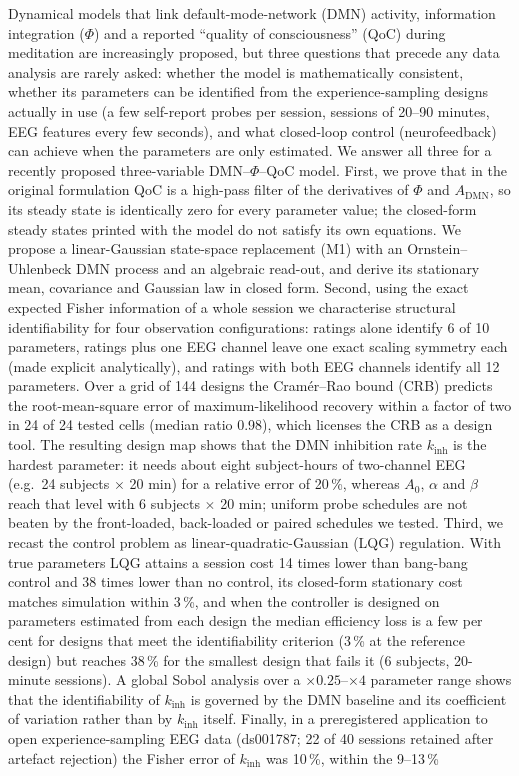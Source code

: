 \documentclass[12pt,a4paper]{article}
\theoremstyle{plain}
\theoremstyle{definition}
\theoremstyle{remark}
\newcommand{\kinh}{k_{\mathrm{inh}}}
\begin{document}
\vspace{0.3cm}
\begin{tcolorbox}[mathbox,title=Abstract]
\small
Dynamical models that link default-mode-network (DMN) activity, information integration ($\Phi$) and a reported ``quality of consciousness'' (QoC) during meditation are increasingly proposed, but three questions that precede any data analysis are rarely asked: whether the model is mathematically consistent, whether its parameters can be identified from the experience-sampling designs actually in use (a few self-report probes per session, sessions of 20--90 minutes, EEG features every few seconds), and what closed-loop control (neurofeedback) can achieve when the parameters are only estimated. We answer all three for a recently proposed three-variable DMN--$\Phi$--QoC model. First, we prove that in the original formulation QoC is a high-pass filter of the derivatives of $\Phi$ and $A_{\mathrm{DMN}}$, so its steady state is identically zero for every parameter value; the closed-form steady states printed with the model do not satisfy its own equations. We propose a linear-Gaussian state-space replacement (M1) with an Ornstein--Uhlenbeck DMN process and an algebraic read-out, and derive its stationary mean, covariance and Gaussian law in closed form. Second, using the exact expected Fisher information of a whole session we characterise structural identifiability for four observation configurations: ratings alone identify 6 of 10 parameters, ratings plus one EEG channel leave one exact scaling symmetry each (made explicit analytically), and ratings with both EEG channels identify all 12 parameters. Over a grid of 144 designs the Cram\'er--Rao bound (CRB) predicts the root-mean-square error of maximum-likelihood recovery within a factor of two in 24 of 24 tested cells (median ratio 0.98), which licenses the CRB as a design tool. The resulting design map shows that the DMN inhibition rate $\kinh$ is the hardest parameter: it needs about eight subject-hours of two-channel EEG (e.g.\ 24 subjects $\times$ 20 min) for a relative error of 20\,\%, whereas $A_0$, $\alpha$ and $\beta$ reach that level with 6 subjects $\times$ 20 min; uniform probe schedules are not beaten by the front-loaded, back-loaded or paired schedules we tested. Third, we recast the control problem as linear-quadratic-Gaussian (LQG) regulation. With true parameters LQG attains a session cost 14 times lower than bang-bang control and 38 times lower than no control, its closed-form stationary cost matches simulation within 3\,\%, and when the controller is designed on parameters estimated from each design the median efficiency loss is a few per cent for designs that meet the identifiability criterion (3\,\% at the reference design) but reaches 38\,\% for the smallest design that fails it (6 subjects, 20-minute sessions). A global Sobol analysis over a $\times 0.25$--$\times 4$ parameter range shows that the identifiability of $\kinh$ is governed by the DMN baseline and its coefficient of variation rather than by $\kinh$ itself. Finally, in a preregistered application to open experience-sampling EEG data (ds001787; 22 of 40 sessions retained after artefact rejection) the Fisher error of $\kinh$ was 10\,\%, within the 9--13\,\% 
\end{tcolorbox}
\end{document}
